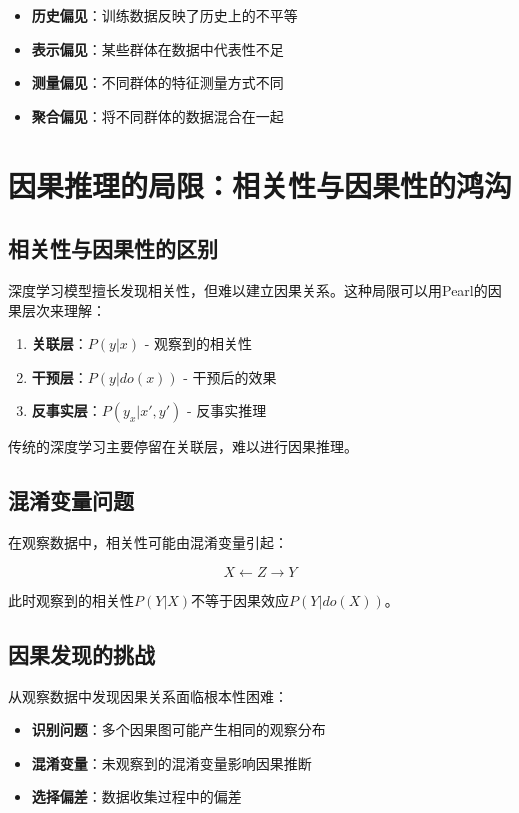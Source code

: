 \begin{itemize}
\item \textbf{历史偏见}：训练数据反映了历史上的不平等
\item \textbf{表示偏见}：某些群体在数据中代表性不足
\item \textbf{测量偏见}：不同群体的特征测量方式不同
\item \textbf{聚合偏见}：将不同群体的数据混合在一起
\end{itemize}

\section{因果推理的局限：相关性与因果性的鸿沟}

\subsection{相关性与因果性的区别}

深度学习模型擅长发现相关性，但难以建立因果关系。这种局限可以用Pearl的因果层次来理解：

\begin{enumerate}
\item \textbf{关联层}：$P(y|x)$ - 观察到的相关性
\item \textbf{干预层}：$P(y|do(x))$ - 干预后的效果
\item \textbf{反事实层}：$P(y_x|x', y')$ - 反事实推理
\end{enumerate}

传统的深度学习主要停留在关联层，难以进行因果推理。

\subsection{混淆变量问题}

在观察数据中，相关性可能由混淆变量引起：

$$X \leftarrow Z \rightarrow Y$$

此时观察到的相关性$P(Y|X)$不等于因果效应$P(Y|do(X))$。

\subsection{因果发现的挑战}

从观察数据中发现因果关系面临根本性困难：

\begin{itemize}
\item \textbf{识别问题}：多个因果图可能产生相同的观察分布
\item \textbf{混淆变量}：未观察到的混淆变量影响因果推断
\item \textbf{选择偏差}：数据收集过程中的偏差
\end{itemize}

